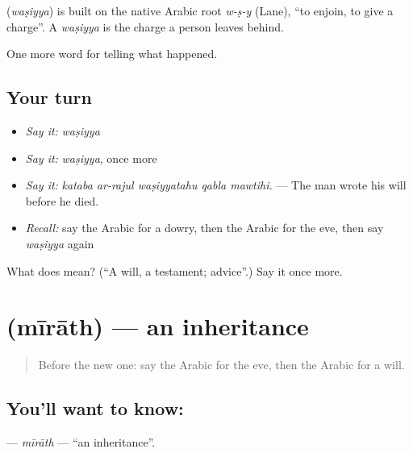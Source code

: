 \begin{cousinweb}
\textbf{} (\emph{waṣiyya}) is built on the native Arabic root \emph{w-ṣ-y} (Lane), \textquotedblleft{}to enjoin, to give a charge\textquotedblright{}. A \emph{waṣiyya} is the charge a person leaves behind.
\end{cousinweb}

\begin{grammarlens}[title={What you've built}]
One more word for telling what happened.
\end{grammarlens}

\subsection*{Your turn}
\begin{itemize}
\raggedright
  \item \emph{Say it:} \emph{waṣiyya}
  \item \emph{Say it:} \emph{waṣiyya}, once more
  \item \emph{Say it:} \emph{kataba ar-rajul waṣiyyatahu qabla mawtihi.} — The man wrote his will before he died.
  \item \emph{Recall:} say the Arabic for a dowry, then the Arabic for the eve, then say \emph{waṣiyya} again
\end{itemize}

\begin{tcolorbox}[breakable,colback=teal!4,colframe=teal!35!black,title={Before you move on}]
What does  mean? (\textquotedblleft{}A will, a testament; advice\textquotedblright{}.) Say it once more.
\end{tcolorbox}
\section[\texorpdfstring{\ar{ميراث} (mīrāth)}{ميراث (mīrāth)}]{ (mīrāth) — an inheritance}

\label{lesson:AR-C337-mirath}



\begin{quote}
Before the new one: say the Arabic for the eve, then the Arabic for a will.
\end{quote}

\subsection*{You'll want to know: }
\textbf{} — \emph{mīrāth} — \textquotedblleft{}an inheritance\textquotedblright{}.

